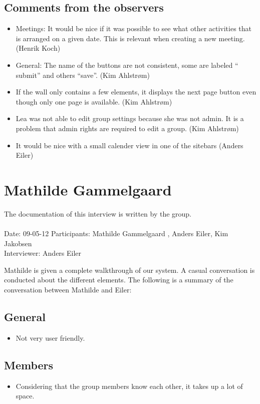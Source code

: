 \subsection*{Comments from the observers}
\begin{itemize}
	\item Meetings: It would be nice if it was possible to see what other activities that is arranged on a given date. This is relevant when creating a new meeting.(Henrik Koch)
	\item General: The name of the buttons are not consistent, some are labeled `` submit'' and others ``save''. (Kim Ahlstrøm)
	\item If the wall only contains a few elements, it displays the next page button even though only one page is available. (Kim Ahlstrøm)
	\item Lea was not able to edit group settings because she was not admin. It is a problem that admin rights are required to edit a group. (Kim Ahlstrøm)
	\item It would be nice with a small calender view in one of the sitebars (Anders Eiler)
\end{itemize}


\section{Mathilde Gammelgaard}
The documentation of this interview is written by the \timelinegroup{} group. \\ \ \\
Date: 09-05-12
Participants: Mathilde Gammelgaard , Anders Eiler, Kim Jakobsen \\
Interviewer: Anders Eiler

Mathilde is given a complete walkthrough of our system.
A casual conversation is conducted about the different elements.
The following is a summary of the conversation between Mathilde and Eiler:

\subsection*{General}
\begin{itemize}
	\item Not very user friendly.
\end{itemize}


\subsection*{Members}
\begin{itemize}
	\item Considering that the group members know each other, it takes up a lot of space.
\end{itemize}


